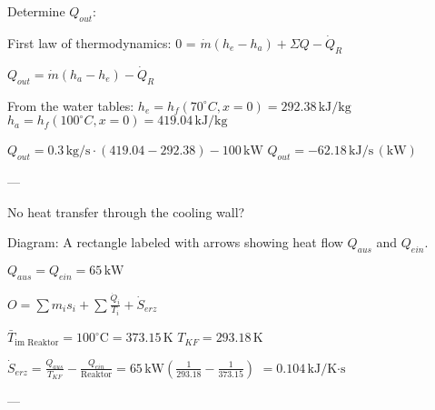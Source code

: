 Determine \( Q_{out} \):  

First law of thermodynamics:  
0 = \( \dot{m} (h_e - h_a) + \Sigma Q - \dot{Q}_R \)  

\( Q_{out} = \dot{m} (h_a - h_e) - \dot{Q}_R \)  

From the water tables:  
\( h_e = h_f (70^\circ C, x = 0) = 292.38 \, \text{kJ/kg} \)  
\( h_a = h_f (100^\circ C, x = 0) = 419.04 \, \text{kJ/kg} \)  

\( Q_{out} = 0.3 \, \text{kg/s} \cdot (419.04 - 292.38) - 100 \, \text{kW} \)  
\( Q_{out} = -62.18 \, \text{kJ/s} \, (\text{kW}) \)  

---

No heat transfer through the cooling wall?  

Diagram: A rectangle labeled with arrows showing heat flow \( Q_{aus} \) and \( Q_{ein} \).  

\( Q_{aus} = Q_{ein} = 65 \, \text{kW} \)  

\( O = \sum m_i s_i + \sum \frac{\dot{Q}_i}{T_i} + \dot{S}_{erz} \)  

\( \bar{T}_{\text{im Reaktor}} = 100^\circ \text{C} = 373.15 \, \text{K} \)  
\( T_{KF} = 293.18 \, \text{K} \)  

\( \dot{S}_{erz} = \frac{Q_{aus}}{T_{KF}} - \frac{Q_{ein}}{\text{Reaktor}} = 65 \, \text{kW} \left( \frac{1}{293.18} - \frac{1}{373.15} \right) \)  
\( = 0.104 \, \text{kJ/K·s} \)  

---